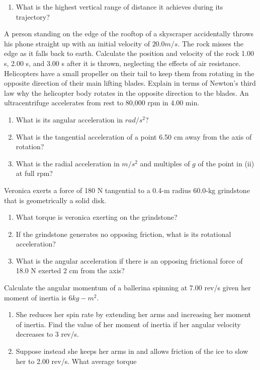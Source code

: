 \documentclass[12pt,addpoints]{exam}
\begin{document}
\begin{questions}
\begin{enumerate}[label=(\roman*)]
			\item What is the highest vertical range of distance it achieves during its trajectory?
		\end{enumerate} 
		\question A person standing on the edge of the rooftop of a skyscraper accidentally throws his phone straight up with an initial velocity of $20.0 m/s$. The rock misses the edge as it falls back to earth. Calculate the position and velocity of the rock 1.00 s, 2.00 s, and 3.00 s after it is thrown, neglecting the effects of air resistance.
		\question Helicopters have a small propeller on their tail to keep them from rotating in the opposite direction of their main lifting blades. Explain in terms of Newton’s third law why the helicopter body rotates in the opposite direction to the blades.
		\question An ultracentrifuge accelerates from rest to 80,000 rpm in 4.00 min.
		\begin{enumerate}[label=(\roman*)]
			\item What is its angular acceleration in $rad/s^2$?
			\item What is the tangential acceleration of a point 6.50 cm away from the axis of rotation?
			\item What is the radial acceleration in $m/s^2$ and multiples of $g$ of the point in (ii) at full rpm?
		\end{enumerate}
		\question Veronica exerts a force of 180 N tangential to a 0.4-m radius 60.0-kg grindstone that is geometrically a solid disk.
		\begin{enumerate}[label=(\roman*)]
			\item What torque is veronica exerting on the grindstone?
			\item If the grindstone generates no opposing friction, what is its rotational acceleration?
			\item What is the angular acceleration if there is an opposing frictional force of 18.0 N exerted 2 cm from the axis?
		\end{enumerate}
		\question Calculate the angular momentum of a ballerina spinning at 7.00 rev/s given her moment of inertia is 6$kg-m^2$.
		\begin{enumerate}[label=(\roman*)]
			\item She reduces her spin rate by extending her arms and increasing her moment of inertia. Find the value of her moment of inertia if her angular velocity decreases to 3 rev/s.
			\item Suppose instead she keeps her arms in and allows friction of the ice to slow her to 2.00 rev/s. What average torque

\end{enumerate}
\end{questions}
\end{document}
